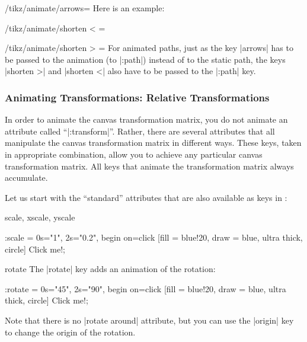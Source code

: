 \begin{key}{/tikz/animate/arrows=}
    Here is an example:
\begin{codeexample}[imagesource={standalone/pgfmanual-en-tikz-animations-animation-33.svg}]
\end{codeexample}
\end{key}

\begin{key}{/tikz/animate/shorten < = }
\end{key}

\begin{key}{/tikz/animate/shorten > = }
    For animated paths, just as the key |arrows| has to be passed to the
    animation (to |:path|) instead of to the static path, the keys |shorten >|
    and |shorten <| also have to be passed to the |:path| key.
\end{key}


\subsubsection{Animating Transformations: Relative Transformations}

In order to animate the canvas transformation matrix, you do not animate an
attribute called ``|:transform|''. Rather, there are several attributes that
all manipulate the canvas transformation matrix in different ways. These keys,
taken in appropriate combination, allow you to achieve any particular canvas
transformation matrix. All keys that animate the transformation matrix always
accumulate.

Let us start with the ``standard'' attributes that are also available as keys
in \tikzname:

\begin{tikzanimateattribute}{scale, xscale, yscale}
\begin{codeexample}[imagesource={standalone/pgfmanual-en-tikz-animations-animation-34.svg}]
\tikz \node :scale = { 0s="1", 2s="0.2", begin on=click}
  [fill = blue!20, draw = blue, ultra thick, circle] {Click me!};
\end{codeexample}
\end{tikzanimateattribute}

\begin{tikzanimateattribute}{rotate}
    The |rotate| key adds an animation of the rotation:
\begin{codeexample}[imagesource={standalone/pgfmanual-en-tikz-animations-animation-35.svg}]
\tikz \node :rotate = { 0s="45", 2s="90", begin on=click}
  [fill = blue!20, draw = blue, ultra thick, circle] {Click me!};
\end{codeexample}
    Note that there is no |rotate around| attribute, but you can use the
    |origin| key to change the origin of the rotation.
\end{tikzanimateattribute}

